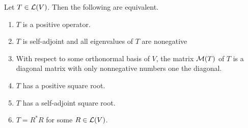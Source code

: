 \begin{thm}
  Let $T \in \mathcal{L}(V)$. Then the following are equivalent.
  \begin{enumerate}[label=\textbf{(\alph*)}]
    \item $T$ is a positive operator.
    \item $T$ is self-adjoint and all eigenvalues of $T$ are nonegative
    \item With respect to some orthonormal basis of $V$, the matrix $\mathcal{M}(T)$ of $T$ is a diagonal matrix with only nonnegative numbers one the diagonal.
    \item $T$ has a positive square root.
    \item $T$ has a self-adjoint square root.
    \item $T = R^* R$ for some $R \in \mathcal{L}(V)$.
  \end{enumerate}
\end{thm}
